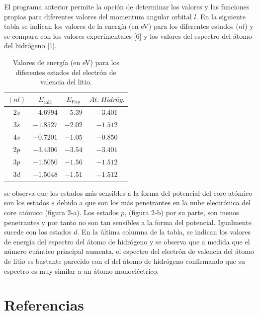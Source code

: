 \documentclass{article}
\begin{document}
El programa anterior permite la opción de determinar los valores y las funciones propias para diferentes valores del momentum angular orbital \(l\). En la siguiente tabla se indican los valores de la energía (en eV) para los diferentes estados (\(nl\)) y se compara con los valores experimentales [6] y los valores del espectro del átomo del hidrógeno [1].\\
\begin{table}[h]
\centering
\caption{Valores de energía (en eV) para los diferentes estados del electrón de valencia del litio.}
\label{tab:energias}
\begin{tabular}{|c|c|c|c|}
\hline
\((nl)\) & \(E_{\text{calc}}\) & \(E_{\text{Exp}}\) & \(At.\;Hidrög.\) \\
\hline
\(2s\) & \(-4.6994\) & \(-5.39\) & \(-3.401\) \\
\hline
\(3s\) & \(-1.8527\) & \(-2.02\) & \(-1.512\) \\
\hline
\(4s\) & \(-0.7201\) & \(-1.05\) & \(-0.850\) \\
\hline
\(2p\) & \(-3.4306\) & \(-3.54\) & \(-3.401\) \\
\hline
\(3p\) & \(-1.5050\) & \(-1.56\) & \(-1.512\) \\
\hline
\(3d\) & \(-1.5048\) & \(-1.51\) & \(-1.512\) \\
\hline
\end{tabular}
\end{table}

se observa que los estados más sensibles a la forma del potencial del core atómico son los estados \(s\) debido a que son los más penetrantes en la nube electrónica del core atómico (figura 2-a). Los estados \(p\), (figura 2-b) por su parte, son menos penetrantes y por tanto no son tan sensibles a la forma del potencial. Igualmente sucede con los estados \(d\). En la última columna de la tabla, se indican los valores de energía del espectro del átomo de hidrógeno y se observa que a medida que el número cuántico principal aumenta, el espectro del electrón de valencia del átomo de litio es bastante parecido con el del átomo de hidrógeno confirmando que su espectro es muy similar a un átomo monoeléctrico.

\section*{Referencias}
\end{document}
